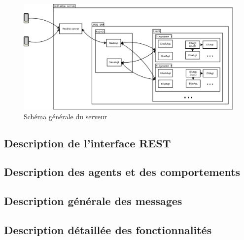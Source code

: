 \vspace*{\fill}
\begin{figure}[!h]
	\includegraphics[width=.95\textwidth]{img/general_server}
	\caption{Schéma générale du serveur}
\end{figure}

\subsection{Description de l'interface REST}

\subsection{Description des agents et des comportements}

\subsection{Description générale des messages}

\subsection{Description détaillée des fonctionnalités}
